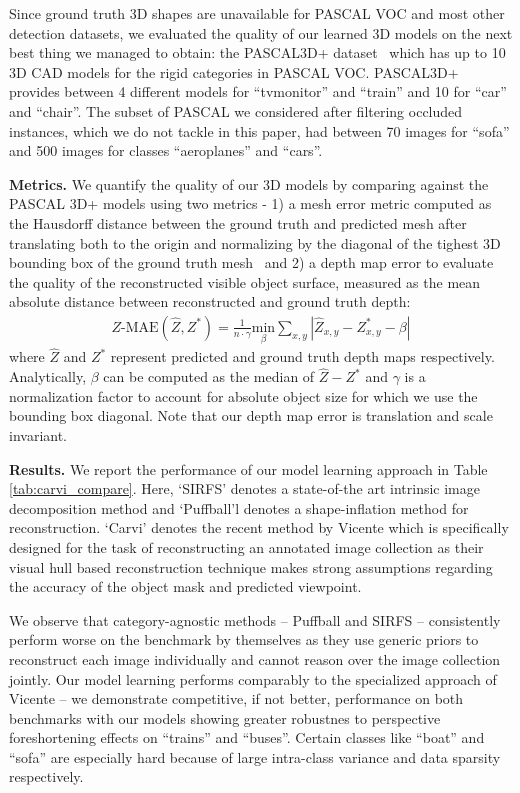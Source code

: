Since ground truth 3D shapes are unavailable for PASCAL VOC and most other detection datasets, we evaluated the quality of our learned 3D models on the next best thing we managed to obtain: the PASCAL3D+ dataset~\cite{pascal3d} which has up to 10 3D CAD models for the rigid categories in PASCAL VOC. PASCAL3D+ provides between 4 different models for ``tvmonitor'' and ``train'' and 10 for ``car'' and ``chair''.
The subset of PASCAL we considered after filtering occluded instances, which we do not tackle in this paper, had between 70 images for ``sofa'' and 500 images for classes ``aeroplanes'' and ``cars''.

\vspace{3mm}
\noindent \textbf{Metrics.} We quantify the quality of our 3D models by comparing against the PASCAL 3D+ models using two metrics - 1) a mesh error metric computed as the Hausdorff distance between the ground truth and predicted mesh after translating both to the origin and normalizing by the diagonal of the tighest 3D bounding box of the ground truth mesh~\cite{aspert2002mesh} and 2) a depth map error to evaluate the quality of the reconstructed visible object surface, measured as the mean absolute distance between reconstructed and ground truth depth:
\begin{gather}
 Z\text{-MAE}(\hat{Z},Z^{*})=\frac{1}{n\cdot\gamma}\underset{\beta}{\text{min}}\underset{x,y}{\sum}|\hat{Z}_{x,y}-Z^*_{x,y}-\beta|
\end{gather}
where $\hat{Z}$ and $Z^*$ represent predicted and ground truth depth maps respectively. Analytically, $\beta$ can be computed as the median of $\hat{Z}-Z^*$ and $\gamma$ is a normalization factor to account for absolute object size for which we use the bounding box diagonal. Note that our depth map error is translation and scale invariant.

\vspace{3mm}
\noindent \textbf{Results.}
We report the performance of our model learning approach in Table \ref{tab:carvi_compare}. Here, `SIRFS' denotes a state-of-the art intrinsic image decomposition method and `Puffball'l\cite{twarog2012playing} denotes a shape-inflation method for reconstruction.  `Carvi' denotes the recent method by Vicente \etal \cite{carvi14} which is specifically designed for the task of reconstructing an annotated image collection as their visual hull based reconstruction technique makes strong assumptions regarding the accuracy of the object mask and predicted viewpoint.

We observe that category-agnostic methods -- Puffball\cite{twarog2012playing} and SIRFS\cite{barronPAMI13, Barron2012B} -- consistently perform worse on the benchmark by themselves as they use generic priors to reconstruct each image individually and cannot reason over the image collection jointly. Our model learning performs comparably to the specialized approach of Vicente \etal -- we demonstrate competitive, if not better, performance on both benchmarks with our models showing greater robustnes to perspective foreshortening effects on ``trains'' and ``buses''.  Certain classes like ``boat'' and ``sofa'' are especially hard because of large intra-class variance and data sparsity respectively.

